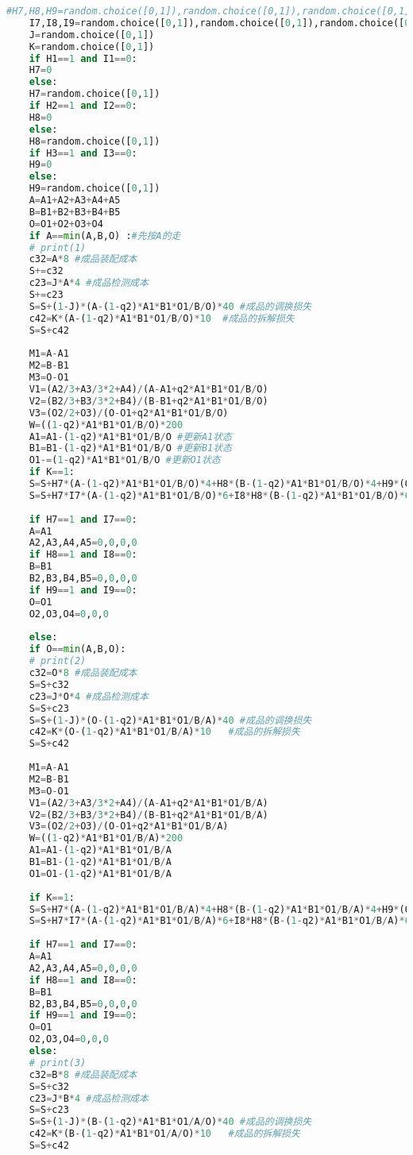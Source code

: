 \documentclass[withoutpreface,bwprint]{cumcmthesis} %
\begin{document}
\begin{lstlisting}[language=python]
 	#H7,H8,H9=random.choice([0,1]),random.choice([0,1]),random.choice([0,1])
 	I7,I8,I9=random.choice([0,1]),random.choice([0,1]),random.choice([0,1])
 	J=random.choice([0,1])
 	K=random.choice([0,1])
 	if H1==1 and I1==0:
 	H7=0
 	else: 
 	H7=random.choice([0,1])
 	if H2==1 and I2==0:
 	H8=0
 	else:
 	H8=random.choice([0,1])
 	if H3==1 and I3==0:
 	H9=0
 	else:
 	H9=random.choice([0,1])
 	A=A1+A2+A3+A4+A5
 	B=B1+B2+B3+B4+B5
 	O=O1+O2+O3+O4
 	if A==min(A,B,O) :#先按A的走
 	# print(1)
 	c32=A*8 #成品装配成本
 	S+=c32
 	c23=J*A*4 #成品检测成本
 	S+=c23
 	S=S+(1-J)*(A-(1-q2)*A1*B1*O1/B/O)*40 #成品的调换损失
 	c42=K*(A-(1-q2)*A1*B1*O1/B/O)*10  #成品的拆解损失
 	S=S+c42 
 	
 	M1=A-A1
 	M2=B-B1
 	M3=O-O1
 	V1=(A2/3+A3/3*2+A4)/(A-A1+q2*A1*B1*O1/B/O)
 	V2=(B2/3+B3/3*2+B4)/(B-B1+q2*A1*B1*O1/B/O)
 	V3=(O2/2+O3)/(O-O1+q2*A1*B1*O1/B/O)
 	W=((1-q2)*A1*B1*O1/B/O)*200
 	A1=A1-(1-q2)*A1*B1*O1/B/O #更新A1状态
 	B1=B1-(1-q2)*A1*B1*O1/B/O #更新B1状态
 	O1-=(1-q2)*A1*B1*O1/B/O #更新O1状态
 	if K==1:
 	S=S+H7*(A-(1-q2)*A1*B1*O1/B/O)*4+H8*(B-(1-q2)*A1*B1*O1/B/O)*4+H9*(O-(1-q2)*A1*B1*O1/B/O)*4
 	S=S+H7*I7*(A-(1-q2)*A1*B1*O1/B/O)*6+I8*H8*(B-(1-q2)*A1*B1*O1/B/O)*6+I9*H9*(O-(1-q2)*A1*B1*O1/B/O)*6
 	
 	if H7==1 and I7==0:
 	A=A1
 	A2,A3,A4,A5=0,0,0,0
 	if H8==1 and I8==0:
 	B=B1
 	B2,B3,B4,B5=0,0,0,0
 	if H9==1 and I9==0:
 	O=O1
 	O2,O3,O4=0,0,0
 	
 	else:
 	if O==min(A,B,O):
 	# print(2)
 	c32=O*8 #成品装配成本
 	S=S+c32
 	c23=J*O*4 #成品检测成本
 	S=S+c23
 	S=S+(1-J)*(O-(1-q2)*A1*B1*O1/B/A)*40 #成品的调换损失
 	c42=K*(O-(1-q2)*A1*B1*O1/B/A)*10   #成品的拆解损失
 	S=S+c42
 	
 	M1=A-A1
 	M2=B-B1
 	M3=O-O1
 	V1=(A2/3+A3/3*2+A4)/(A-A1+q2*A1*B1*O1/B/A)
 	V2=(B2/3+B3/3*2+B4)/(B-B1+q2*A1*B1*O1/B/A)
 	V3=(O2/2+O3)/(O-O1+q2*A1*B1*O1/B/A)
 	W=((1-q2)*A1*B1*O1/B/A)*200
 	A1=A1-(1-q2)*A1*B1*O1/B/A
 	B1=B1-(1-q2)*A1*B1*O1/B/A
 	O1=O1-(1-q2)*A1*B1*O1/B/A
 	
 	if K==1:
 	S=S+H7*(A-(1-q2)*A1*B1*O1/B/A)*4+H8*(B-(1-q2)*A1*B1*O1/B/A)*4+H9*(O-(1-q2)*A1*B1*O1/B/A)*4
 	S=S+H7*I7*(A-(1-q2)*A1*B1*O1/B/A)*6+I8*H8*(B-(1-q2)*A1*B1*O1/B/A)*6+I9*H9*(O-(1-q2)*A1*B1*O1/B/A)*6
 	
 	if H7==1 and I7==0:
 	A=A1
 	A2,A3,A4,A5=0,0,0,0
 	if H8==1 and I8==0:
 	B=B1
 	B2,B3,B4,B5=0,0,0,0
 	if H9==1 and I9==0:
 	O=O1
 	O2,O3,O4=0,0,0
 	else:
 	# print(3)
 	c32=B*8 #成品装配成本
 	S=S+c32
 	c23=J*B*4 #成品检测成本
 	S=S+c23
 	S=S+(1-J)*(B-(1-q2)*A1*B1*O1/A/O)*40 #成品的调换损失
 	c42=K*(B-(1-q2)*A1*B1*O1/A/O)*10   #成品的拆解损失
 	S=S+c42 
 	

\end{lstlisting}
\end{document}

